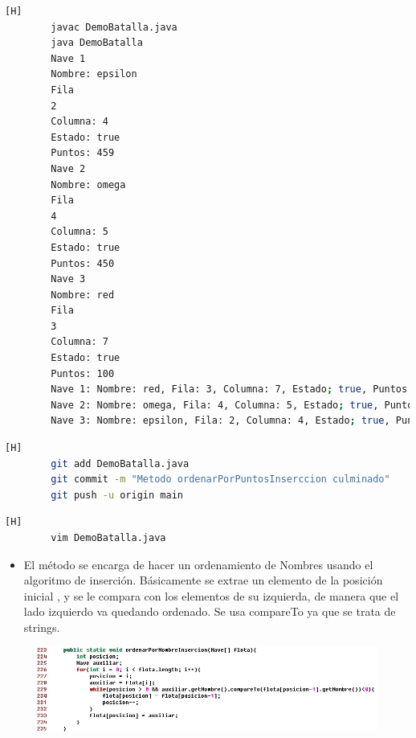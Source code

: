\documentclass{article}
\begin{document}
	
	\begin{lstlisting}[language=bash,caption={Probando el metodo ordenarPorPuntoSeleccion}][H]	
		javac DemoBatalla.java
		java DemoBatalla
		Nave 1
		Nombre: epsilon
		Fila
		2
		Columna: 4
		Estado: true
		Puntos: 459
		Nave 2
		Nombre: omega
		Fila
		4
		Columna: 5
		Estado: true
		Puntos: 450
		Nave 3
		Nombre: red
		Fila
		3
		Columna: 7
		Estado: true
		Puntos: 100
		Nave 1: Nombre: red, Fila: 3, Columna: 7, Estado; true, Puntos: 100
		Nave 2: Nombre: omega, Fila: 4, Columna: 5, Estado; true, Puntos: 450
		Nave 3: Nombre: epsilon, Fila: 2, Columna: 4, Estado; true, Puntos: 459
	\end{lstlisting}
	\begin{lstlisting}[language=bash,caption={Commit: "Metodo ordenarPorPuntosInserccion culminado" }][H]
		git add DemoBatalla.java
		git commit -m "Metodo ordenarPorPuntosInserccion culminado"	
		git push -u origin main
	\end{lstlisting}
	
	
	
	
	
	
	
	
	
	
	\begin{lstlisting}[language=bash,caption={Implementado el método ordenarPorNombreInsercion y dándole detalles al código}][H]
		vim DemoBatalla.java
	\end{lstlisting}
	
	
	\begin{itemize}	
		\item El método se encarga de hacer un ordenamiento de Nombres usando el algoritmo  de inserción. Básicamente se extrae un elemento de la posición inicial , y se le compara con los elementos de su izquierda, de manera que el lado izquierdo va quedando ordenado. Se usa compareTo ya que se trata de strings.
	\end{itemize}	
	
	\begin{figure}[H]
		\centering
		\includegraphics[width=1\textwidth,keepaspectratio]{img/12.jpg}
	\end{figure}
	
\end{document}
